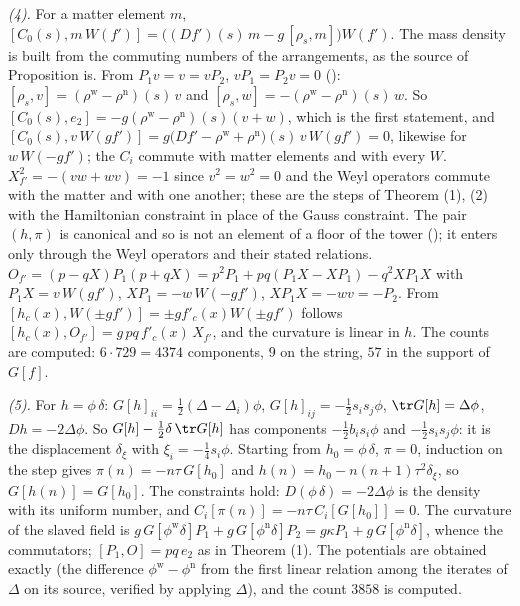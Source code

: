 \emph{(4).} For a matter element $m$, $[C_{0}(s), m\,W(f')] = \bigl((Df')(s)\,m - g\,[\rho_{s}, m]\bigr)W(f')$. The mass density is built from the commuting numbers of the arrangements, as the source of Proposition  is. From $P_{1}v = v = vP_{2}$, $vP_{1} = P_{2}v = 0$ (): $[\rho_{s}, v] = (\rho^{\mathrm{w}} - \rho^{\mathrm{n}})(s)\,v$ and $[\rho_{s}, w] = -(\rho^{\mathrm{w}} - \rho^{\mathrm{n}})(s)\,w$. So $[C_{0}(s), e_{2}] = -g(\rho^{\mathrm{w}} - \rho^{\mathrm{n}})(s)(v + w)$, which is the first statement, and $[C_{0}(s), v\,W(gf')] = g\bigl(Df' - \rho^{\mathrm{w}} + \rho^{\mathrm{n}}\bigr)(s)\,v\,W(gf') = 0$, likewise for $w\,W(-gf')$; the $C_{i}$ commute with matter elements and with every $W$. $X_{f'}^{2} = -(vw + wv) = -1$ since $v^{2} = w^{2} = 0$ and the Weyl operators commute with the matter and with one another; these are the steps of Theorem (1), (2) with the Hamiltonian constraint in place of the Gauss constraint. The pair $(h, \pi)$ is canonical and so is not an element of a floor of the tower (); it enters only through the Weyl operators and their stated relations. $O_{f'} = (p - qX)P_{1}(p + qX) = p^{2}P_{1} + pq(P_{1}X - XP_{1}) - q^{2}XP_{1}X$ with $P_{1}X = v\,W(gf')$, $XP_{1} = -w\,W(-gf')$, $XP_{1}X = -wv = -P_{2}$. From $[h_{c}(x), W(\pm gf')] = \pm g f'_{c}(x)W(\pm gf')$ follows $[h_{c}(x), O_{f'}] = g\,pq\,f'_{c}(x)\,X_{f'}$, and the curvature is linear in $h$. The counts are computed: $6\cdot 729 = 4374$ components, $9$ on the string, $57$ in the support of $G[f]$.

\emph{(5).} For $h = \phi\,\delta$: $G[h]_{ii} = \tfrac12(\Delta - \Delta_{i})\phi$, $G[h]_{ij} = -\tfrac12 s_{i}s_{j}\phi$, $\tr G[h] = \Delta\phi$, $Dh = -2\Delta\phi$. So $G[h] - \tfrac12\delta\,\tr G[h]$ has components $-\tfrac12 b_{i}s_{i}\phi$ and $-\tfrac12 s_{i}s_{j}\phi$: it is the displacement $\delta_{\xi}$ with $\xi_{i} = -\tfrac14 s_{i}\phi$. Starting from $h_{0} = \phi\,\delta$, $\pi = 0$, induction on the step gives $\pi(n) = -n\tau\,G[h_{0}]$ and $h(n) = h_{0} - n(n+1)\tau^{2}\delta_{\xi}$, so $G[h(n)] = G[h_{0}]$. The constraints hold: $D(\phi\,\delta) = -2\Delta\phi$ is the density with its uniform number, and $C_{i}[\pi(n)] = -n\tau\,C_{i}[G[h_{0}]] = 0$. The curvature of the slaved field is $g\,G[\phi^{\mathrm{w}}\delta]P_{1} + g\,G[\phi^{\mathrm{n}}\delta]P_{2} = g\kappa P_{1} + g\,G[\phi^{\mathrm{n}}\delta]$, whence the commutators; $[P_{1}, O] = pq\,e_{2}$ as in Theorem (1). The potentials are obtained exactly (the difference $\phi^{\mathrm{w}} - \phi^{\mathrm{n}}$ from the first linear relation among the iterates of $\Delta$ on its source, verified by applying $\Delta$), and the count $3858$ is computed.

